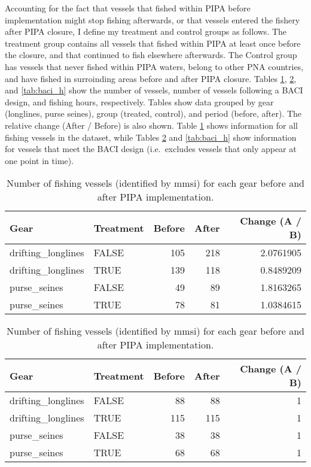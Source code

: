 \documentclass[]{article}
\theoremstyle{definition}
\theoremstyle{definition}
\theoremstyle{definition}
\theoremstyle{remark}
\begin{document}
Accounting for the fact that vessels that fished within PIPA before
implementation might stop fishing afterwards, or that vessels entered
the fishery after PIPA closure, I define my treatment and control groups
as follows. The treatment group contains all vessels that fished within
PIPA at least once before the closure, and that continued to fish
elsewhere afterwards. The Control group has vessels that never fished
within PIPA waters, belong to other PNA countries, and have fished in
surroinding areas before and after PIPA closure. Tables
\ref{tab:baci_n}, \ref{tab:baci_n_s}, and \ref{tab:baci_h} show the
number of vessels, number of vessels following a BACI design, and
fishing hours, respectively. Tables show data grouped by gear
(longlines, purse seines), group (treated, control), and period (before,
after). The relative change (After / Before) is also shown. Table
\ref{tab:baci_n} shows information for all fishing vessels in the
dataset, while Tables \ref{tab:baci_n_s} and \ref{tab:baci_h} show
information for vessels that meet the BACI design (i.e.~excludes vessels
that only appear at one point in time).

\begin{table}[H]

\caption{\label{tab:unnamed-chunk-4}\label{tab:baci_n}Number of fishing vessels (identified by mmsi) for each gear before and after PIPA implementation.}
\centering
\begin{tabular}[t]{llrrr}
\toprule
Gear & Treatment & Before & After & Change (A / B)\\
\midrule
drifting\_longlines & FALSE & 105 & 218 & 2.0761905\\
drifting\_longlines & TRUE & 139 & 118 & 0.8489209\\
purse\_seines & FALSE & 49 & 89 & 1.8163265\\
purse\_seines & TRUE & 78 & 81 & 1.0384615\\
\bottomrule
\end{tabular}
\end{table}

\begin{table}[H]

\caption{\label{tab:unnamed-chunk-5}\label{tab:baci_n_s}Number of fishing vessels (identified by mmsi) for each gear before and after PIPA implementation.}
\centering
\begin{tabular}[t]{llrrr}
\toprule
Gear & Treatment & Before & After & Change (A / B)\\
\midrule
drifting\_longlines & FALSE & 88 & 88 & 1\\
drifting\_longlines & TRUE & 115 & 115 & 1\\
purse\_seines & FALSE & 38 & 38 & 1\\
purse\_seines & TRUE & 68 & 68 & 1\\
\bottomrule
\end{tabular}
\end{table}
\end{document}
